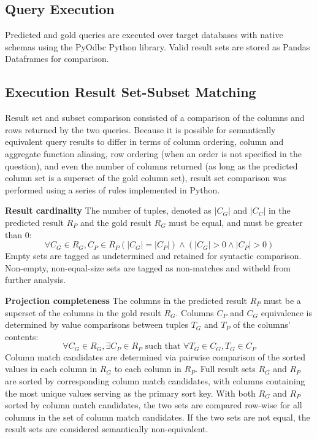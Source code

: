 \subsection{Query Execution}

Predicted and gold queries are executed over target databases with native schemas using the PyOdbc Python library.
Valid result sets are stored as Pandas Dataframes for comparison.

\subsection{Execution Result Set-Subset Matching}

Result set and subset comparison consisted of a comparison of the columns and rows returned by the two queries. Because it is possible for semantically equivalent query results to differ in terms of column ordering, column and aggregate function aliasing, row ordering (when an order is not specified in the question), and even the number of columns returned (as long as the predicted column set is a superset of the gold column set), result set comparison was performed using a series of rules implemented in Python.

\textbf{Result cardinality} The number of tuples, denoted as $|C_G|$ and $|C_C|$ in the predicted result $R_P$ and the gold result $R_G$ must be equal, and must be greater than 0:
$$\forall C_G \in R_G, C_P \in R_P \left(|C_G| = |C_P|\right) \land (|C_G| > 0 \land |C_P| > 0)$$
Empty sets are tagged as undetermined and retained for syntactic comparison. Non-empty, non-equal-size sets are tagged as non-matches and witheld from further analysis.

\textbf{Projection completeness} The columns in the predicted result $R_P$ must be a superset of the columns in the gold result $R_G$. Columns $C_P$ and $C_G$ equivalence is determined by value comparisons between tuples $T_G$ and $T_P$ of the columns' contents:
\[\forall C_G \in R_G, \exists C_P \in R_P \text{ such that } \forall T_G \in C_G, T_G \in C_P\]
Column match candidates are determined via pairwise comparison of the sorted values in each column in $R_G$ to each column in $R_P$. Full result sets $R_G$ and $R_P$ are sorted by corresponding column match candidates, with columns containing the most unique values serving as the primary sort key. With both $R_G$ and $R_P$ sorted by column match candidates, the two sets are compared row-wise for all columns in the set of column match candidates. If the two sets are not equal, the result sets are considered semantically non-equivalent.


